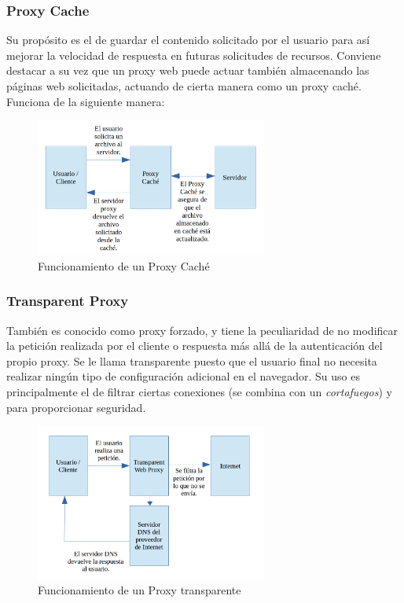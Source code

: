 \subsubsection{Proxy Cache}

Su propósito es el de guardar el contenido solicitado por el usuario para así mejorar la velocidad de respuesta en futuras solicitudes de recursos. 
Conviene destacar a su vez que un proxy web puede actuar también almacenando las páginas web solicitadas, actuando de cierta manera como un proxy caché. Funciona de la siguiente manera:

\begin{figure}[h]
	\centerline{
		\mbox{\includegraphics[width=3.00in]{images/proxy_cache.png}}
	}
	\caption{Funcionamiento de un Proxy Caché}
	\label{fig:proxy_cache}
\end{figure}

\subsubsection{Transparent Proxy}

También es conocido como proxy forzado, y tiene la peculiaridad de no modificar la petición realizada por el cliente o respuesta más allá de la autenticación del propio proxy.
Se le llama transparente puesto que el usuario final no necesita realizar ningún tipo de configuración adicional en el navegador.
Su uso es principalmente el de filtrar ciertas conexiones (se combina con un \textit{cortafuegos}) y para proporcionar seguridad.

\begin{figure}[h]
	\centerline{
		\mbox{\includegraphics[width=3.00in]{images/proxy_transparent.png}}
	}
	\caption{Funcionamiento de un Proxy transparente~\cite{article:proxy_trans}}
	\label{fig:trans_proxy}
\end{figure}

